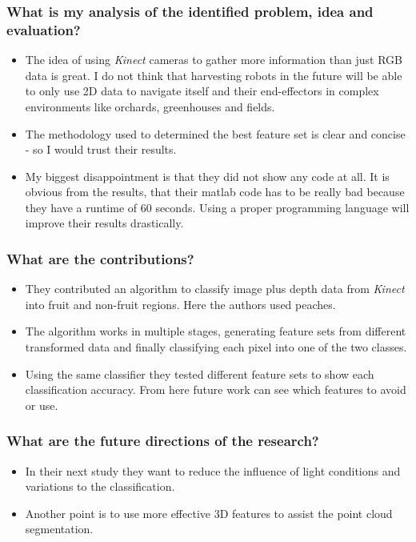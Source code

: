 \subsubsection*{What is my analysis of the identified problem, idea and evaluation?}
\begin{itemize}
    \item The idea of using \emph{Kinect} cameras to gather more information than just RGB data is great. I do not think that harvesting robots in the future will be able to only use 2D data to navigate itself and their end-effectors in complex environments like orchards, greenhouses and fields.
    \item The methodology used to determined the best feature set is clear and concise - so I would trust their results.
    \item My biggest disappointment is that they did not show any code at all. It is obvious from the results, that their matlab code has to be really bad because they have a runtime of 60 seconds. Using a proper programming language will improve their results drastically.
\end{itemize}
\subsubsection*{What are the contributions?}
\begin{itemize}
    \item They contributed an algorithm to classify image plus depth data from \emph{Kinect} into fruit and non-fruit regions. Here the authors used peaches. 
    \item The algorithm works in multiple stages, generating feature sets from different transformed data and finally classifying each pixel into one of the two classes.
    \item Using the same classifier they tested different feature sets to show each classification accuracy. From here future work can see which features to avoid or use.
\end{itemize}
\subsubsection*{What are the future directions of the research?}
\begin{itemize}
    \item In their next study they want to reduce the influence of light conditions and variations to the classification. 
    \item Another point is to use more effective 3D features to assist the point cloud segmentation.
\end{itemize}
